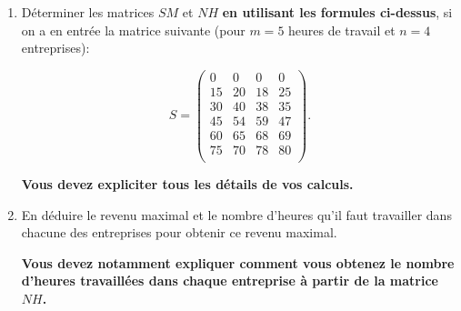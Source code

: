 \documentclass[11pt]{article}
\begin{document}
\begin{enumerate}[label=\Roman*.]

\item Déterminer les matrices $SM$ et $NH$ \textbf{en utilisant les formules ci-dessus},  si on a en entrée la matrice  suivante (pour $m=5$ heures de travail et $n=4$ entreprises):



$$S=\left( \begin{matrix}
0& 0& 0 & 0   \\
15& 20& 18 & 25   \\
30& 40& 38 & 35   \\
45& 54& 59 & 47   \\
60& 65& 68 & 69   \\
75& 70& 78 & 80   \\
\end{matrix}  \right).$$

\textbf{Vous devez expliciter tous les détails de vos calculs.}

\item En déduire le revenu maximal et le nombre d'heures qu'il faut travailler dans chacune des entreprises pour obtenir ce revenu maximal.

\textbf{Vous devez notamment expliquer comment vous obtenez le nombre d'heures travaillées dans chaque entreprise à partir de la matrice $NH$.}

\end{enumerate}
\end{document}
